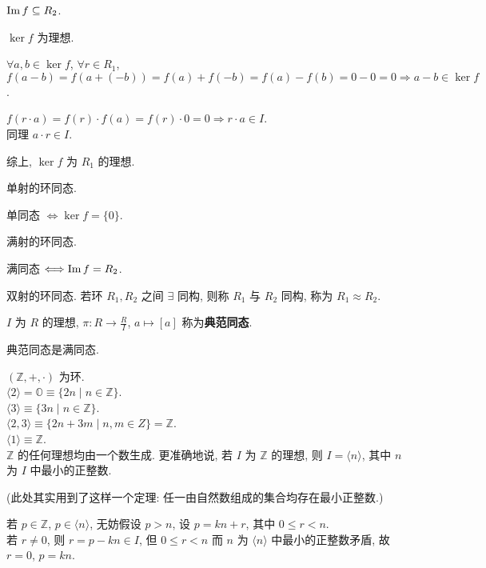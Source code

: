 \documentclass{note}
\begin{document}
$\operatorname{Im} f\subseteq R_2$.

\begin{thm}
    $\ker f$ 为理想.
\end{thm}
\begin{pf}
    $\forall a,b\in\ker f$, $\forall r\in R_1$, $f(a-b)=f(a+(-b))=f(a)+f(-b)=f(a)-f(b)=0-0=0\Longrightarrow a-b\in\ker f$.

    $f(r\cdot a)=f(r)\cdot f(a)=f(r)\cdot 0=0\Longrightarrow r\cdot a\in I$.\\
    同理 $a\cdot r\in I$.

    综上, $\ker f$ 为 $R_1$ 的理想.
\end{pf}

\begin{df}[单同态]
    单射的环同态.
\end{df}

单同态 $\Longleftrightarrow\ker f=\{0\}$.

\begin{df}[满同态]
    满射的环同态.
\end{df}

满同态 $\Longleftrightarrow\operatorname{Im} f=R_2$.

\begin{df}[同构]
    双射的环同态. 若环 $R_1,R_2$ 之间 $\exists$ 同构, 则称 $R_1$ 与 $R_2$ 同构, 称为 $R_1\approx R_2$.
\end{df}

\begin{df}[典范同态]
    $I$ 为 $R$ 的理想, $\pi:R\rightarrow\frac{R}{I}$, $a\mapsto[a]$ 称为\textbf{典范同态}.
\end{df}

典范同态是满同态.

\begin{eg}
    $(\mathbb{Z},+,\cdot)$ 为环.\\
    $\langle 2\rangle=\mathbb{O}\equiv\{2n\mid n\in\mathbb{Z}\}$.\\
    $\langle 3\rangle\equiv\{3n\mid n\in\mathbb{Z}\}$.\\
    $\langle 2,3\rangle\equiv\{2n+3m\mid n,m\in Z\}=\mathbb{Z}$.\\
    $\langle 1\rangle\equiv\mathbb{Z}$.\\
    $\mathbb{Z}$ 的任何理想均由一个数生成. 更准确地说, 若 $I$ 为 $\mathbb{Z}$ 的理想, 则 $I=\langle n\rangle$, 其中 $n$ 为 $I$ 中最小的正整数.
\end{eg}
(此处其实用到了这样一个定理: 任一由自然数组成的集合均存在最小正整数.)
\begin{pf}
    若 $p\in\mathbb{Z}$, $p\in\langle n\rangle$, 无妨假设 $p>n$, 设 $p=kn+r$, 其中 $0\leq r<n$.\\
    若 $r\neq 0$, 则 $r=p-kn\in I$, 但 $0\leq r<n$ 而 $n$ 为 $\langle n\rangle$ 中最小的正整数矛盾, 故 $r=0$, $p=kn$.
\end{pf}
\end{document}

